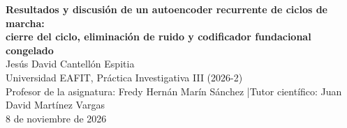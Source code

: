 \documentclass[11pt,a4paper]{article}
\begin{document}
\noindent{}

\vspace{10pt}
\begin{center}
{\large\bfseries Resultados y discusión de un autoencoder recurrente de ciclos de marcha:\\ cierre del ciclo, eliminación de ruido y codificador fundacional congelado}\\[8pt]
Jesús David Cantellón Espitia\\
{\small Universidad EAFIT, Práctica Investigativa III (2026-2)}\\
{\small Profesor de la asignatura: Fredy Hernán Marín Sánchez \quad|\quad Tutor científico: Juan David Martínez Vargas}\\
{\small 8 de noviembre de 2026}
\end{center}
\end{document}
